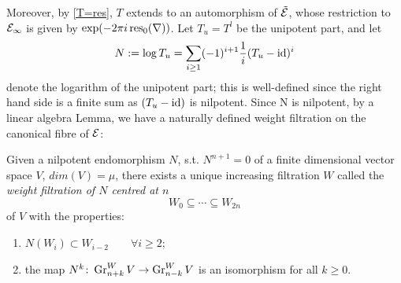 \documentclass[../main.tex]{subfiles}
\begin{document}
Moreover, by \ref{T=res}, $T$ extends to an automorphism of $\tilde{\mathcal{E}}$, whose restriction to $\mathcal{E}_{\infty}$ is given by $\exp(-2\pi i \operatorname{res}_0(\nabla))$. Let $T_u=T^l$ be the unipotent part, and let
\[N := \log T_u =\sum_{i\ge 1} (-1)^{i+1}\frac1i(T_u-\operatorname{id})^i\]
denote the logarithm of the unipotent part; this is well-defined since the right hand side is a finite sum as $(T_u - \operatorname{id})$ is nilpotent.
Since N is nilpotent, by a linear algebra Lemma, we have a naturally defined weight filtration on the canonical fibre of $\mathcal{E}$:
\begin{lemma} \textup{\cite[Lemma 6.4]{Sc73}} \label{WeightFilt}
     Given a nilpotent endomorphism $N$, s.t. $N^{n+1}=0$ of a finite dimensional vector space $V$, $dim(V)=\mu$, there exists a unique increasing filtration  $W$ called the \emph{weight filtration of $N$ centred at $n$} 
     \[
       W_0 \subseteq \cdots \subseteq W_{2n}
     \]
     of $V$ with the properties:
    \begin{enumerate}
       \item  $N(W_i) \subset W_{i-2} \qquad \forall i \geq 2$; 
       \item  the map $N^k \colon \operatorname{Gr}^W_{n+k} V \to \operatorname{Gr}^W_{n-k} V$
is an isomorphism for all $k \geq 0$.
    \end{enumerate}
\end{lemma}
\end{document}
